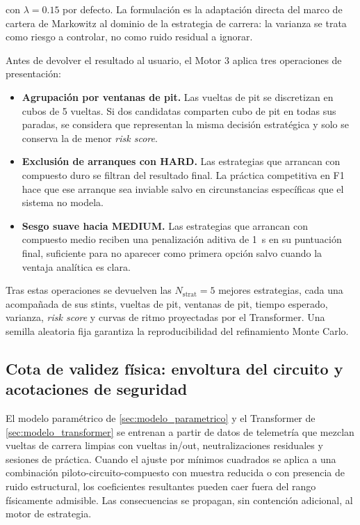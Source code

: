 con $\lambda = 0.15$ por defecto. La formulación es la adaptación directa del marco de cartera de Markowitz \cite{markowitz1952portfolio} al dominio de la estrategia de carrera: la varianza se trata como riesgo a controlar, no como ruido residual a ignorar.

Antes de devolver el resultado al usuario, el Motor 3 aplica tres operaciones de presentación:

\begin{itemize}
    \item \textbf{Agrupación por ventanas de pit.} Las vueltas de pit se discretizan en cubos de 5 vueltas. Si dos candidatas comparten cubo de pit en todas sus paradas, se considera que representan la misma decisión estratégica y solo se conserva la de menor \textit{risk score}.
    \item \textbf{Exclusión de arranques con HARD.} Las estrategias que arrancan con compuesto duro se filtran del resultado final. La práctica competitiva en F1 hace que ese arranque sea inviable salvo en circunstancias específicas que el sistema no modela.
    \item \textbf{Sesgo suave hacia MEDIUM.} Las estrategias que arrancan con compuesto medio reciben una penalización aditiva de 1~s en su puntuación final, suficiente para no aparecer como primera opción salvo cuando la ventaja analítica es clara.
\end{itemize}

Tras estas operaciones se devuelven las $N_\text{strat} = 5$ mejores estrategias, cada una acompañada de sus stints, vueltas de pit, ventanas de pit, tiempo esperado, varianza, \textit{risk score} y curvas de ritmo proyectadas por el Transformer. Una semilla aleatoria fija garantiza la reproducibilidad del refinamiento Monte Carlo.

\subsection{Cota de validez física: envoltura del circuito y acotaciones de seguridad}
\label{ssec:envoltura_circuito}

El modelo paramétrico de \ref{sec:modelo_parametrico} y el Transformer de \ref{sec:modelo_transformer} se entrenan a partir de datos de telemetría que mezclan vueltas de carrera limpias con vueltas in/out, neutralizaciones residuales y sesiones de práctica. Cuando el ajuste por mínimos cuadrados se aplica a una combinación piloto-circuito-compuesto con muestra reducida o con presencia de ruido estructural, los coeficientes resultantes pueden caer fuera del rango físicamente admisible. Las consecuencias se propagan, sin contención adicional, al motor de estrategia.

